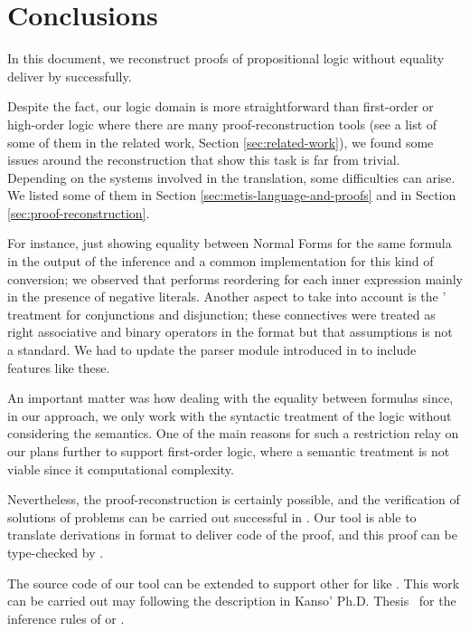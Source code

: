 \documentclass[../main.tex]{subfiles}
\begin{document}

\section{Conclusions}
\label{sec:conclusions}

In this document, we reconstruct proofs
of propositional logic without equality deliver by \Metis
successfully.

Despite the fact, our logic domain is more straightforward than
first-order or high-order logic where there are many
proof-reconstruction tools (see a list of some of them in the
related work, Section \ref{sec:related-work}), we found some issues
around the reconstruction that show this task is far from trivial.
Depending  on the systems involved in the translation, some
difficulties can arise. We listed some of them in Section
\ref{sec:metis-language-and-proofs} and in Section
\ref{sec:proof-reconstruction}.

For instance, just showing equality between Normal Forms for the
same formula in the output of the \canonicalize inference and a
common implementation for this kind of conversion; we observed that
\Metis performs reordering for each inner expression mainly in the
presence of negative literals. Another aspect to take into account
is the \Metis' treatment for conjunctions and disjunction;
these connectives were treated as right associative and binary
operators in the \TSTP format but that assumptions is not a standard.
We had to update the \TSTP parser module introduced in
\cite{Gomez-Londono2015} to include features like these.

An important matter was how dealing with
the equality between formulas since, in our approach, we only work
with the syntactic treatment of the logic without considering the
semantics.
One of the main reasons for such a restriction relay on our plans
further to support first-order logic, where a semantic treatment is
not viable since it computational complexity.

Nevertheless, the proof-reconstruction is certainly possible, and
the verification of solutions of \CPL problems can be carried out
successful in \Agda. Our tool is able to translate \Metis
derivations in \TSTP format to deliver \Agda code of the proof,
and this proof can be type-checked by \Agda.

The source code of our tool can be extended to support
other \ATPs for \CPL like . This work can be carried out
may following the description in Kanso' Ph.D. Thesis~\cite{Kanso2012}
for the inference rules of  or .
\end{document}
